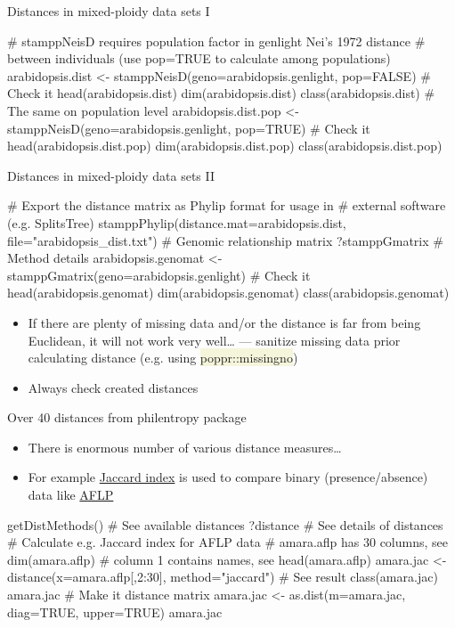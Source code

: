 \documentclass[compress, ucs, xelatex, 11pt, xcolor=svgnames, aspectratio=169,
	hyperref={
		bookmarks=true,
		unicode=true,
		colorlinks=true,
		pdftitle={Molecular data in R},
		plainpages=false,
		pdfauthor={Vojtech Zeisek},
		pdfsubject={Course about phylogeny and evolution in R},
		pdfcreator={XeLaTeX},
		pdfkeywords={R, evolution, phylogeny, molecular data},
		linkcolor=Crimson, %
		anchorcolor=Magenta, %
		citecolor=Magenta, %
		filecolor=Magenta, %
		menucolor=Magenta, %
		urlcolor=DodgerBlue, %
		pdftex},
	url={hyphens, lowtilde} %
	]{beamer}
\renewcommand{\texttt}[1]{\colorbox{Beige}{{\ttfamily #1}}}
\begin{document}
\begin{frame}[fragile]{Distances in mixed-ploidy data sets I}
	\begin{spluscode}
    # stamppNeisD requires population factor in genlight Nei's 1972 distance
    # between individuals (use pop=TRUE to calculate among populations)
    arabidopsis.dist <- stamppNeisD(geno=arabidopsis.genlight, pop=FALSE)
    # Check it
    head(arabidopsis.dist)
    dim(arabidopsis.dist)
    class(arabidopsis.dist)
    # The same on population level
    arabidopsis.dist.pop <- stamppNeisD(geno=arabidopsis.genlight, pop=TRUE)
    # Check it
    head(arabidopsis.dist.pop)
    dim(arabidopsis.dist.pop)
    class(arabidopsis.dist.pop)
	\end{spluscode}
\end{frame}

\begin{frame}[fragile]{Distances in mixed-ploidy data sets II}
	\begin{spluscode}
    # Export the distance matrix as Phylip format for usage in
    # external software (e.g. SplitsTree)
    stamppPhylip(distance.mat=arabidopsis.dist, file="arabidopsis_dist.txt")
    # Genomic relationship matrix
    ?stamppGmatrix # Method details
    arabidopsis.genomat <- stamppGmatrix(geno=arabidopsis.genlight)
    # Check it
    head(arabidopsis.genomat)
    dim(arabidopsis.genomat)
    class(arabidopsis.genomat)
	\end{spluscode}
	\begin{itemize}
		\item If there are plenty of missing data and/or the distance is far from being Euclidean, it will not work very well\ldots{ } --- sanitize missing data prior calculating distance (e.g. using \texttt{poppr::missingno})
		\item Always check created distances
	\end{itemize}
\end{frame}

\begin{frame}[fragile]{Over 40 distances from philentropy package}
	\begin{itemize}
		\item There is enormous number of various distance measures\ldots
		\item For example \href{https://en.wikipedia.org/wiki/Jaccard_index}{Jaccard index} is used to compare binary (presence/absence) data like \href{https://en.wikipedia.org/wiki/Amplified_fragment_length_polymorphism}{AFLP}
	\end{itemize}
	\begin{spluscode}
    getDistMethods() # See available distances
    ?distance # See details of distances
    # Calculate e.g. Jaccard index for AFLP data
    # amara.aflp has 30 columns, see dim(amara.aflp)
    # column 1 contains names, see head(amara.aflp)
    amara.jac <- distance(x=amara.aflp[,2:30], method="jaccard")
    # See result
    class(amara.jac)
    amara.jac
    # Make it distance matrix
    amara.jac <- as.dist(m=amara.jac, diag=TRUE, upper=TRUE)
    amara.jac
	\end{spluscode}
\end{frame}
\end{document}
